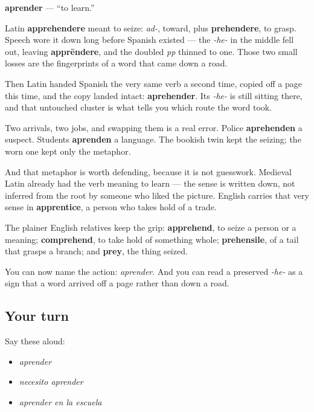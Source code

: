 \begin{cousinweb}
\textbf{aprender} — \textquotedblleft{}to learn.\textquotedblright{}

Latin \textbf{apprehendere} meant to seize: \emph{ad-}, toward, plus \textbf{prehendere}, to grasp. Speech wore it down long before Spanish existed — the \emph{-he-} in the middle fell out, leaving \textbf{apprēndere}, and the doubled \emph{pp} thinned to one. Those two small losses are the fingerprints of a word that came down a road.

Then Latin handed Spanish the very same verb a second time, copied off a page this time, and the copy landed intact: \textbf{aprehender}. Its \emph{-he-} is still sitting there, and that untouched cluster is what tells you which route the word took.

Two arrivals, two jobs, and swapping them is a real error. Police \textbf{aprehenden} a suspect. Students \textbf{aprenden} a language. The bookish twin kept the seizing; the worn one kept only the metaphor.

And that metaphor is worth defending, because it is not guesswork. Medieval Latin already had the verb meaning to learn — the sense is written down, not inferred from the root by someone who liked the picture. English carries that very sense in \textbf{apprentice}, a person who takes hold of a trade.

The plainer English relatives keep the grip: \textbf{apprehend}, to seize a person or a meaning; \textbf{comprehend}, to take hold of something whole; \textbf{prehensile}, of a tail that grasps a branch; and \textbf{prey}, the thing seized.
\end{cousinweb}

\begin{grammarlens}[title={What you've built}]
You can now name the action: \emph{aprender}. And you can read a preserved \emph{-he-} as a sign that a word arrived off a page rather than down a road.
\end{grammarlens}

\subsection*{Your turn}
Say these aloud:

\begin{itemize}
\raggedright
  \item \emph{aprender}
  \item \emph{necesito aprender}
  \item \emph{aprender en la escuela}
\end{itemize}


